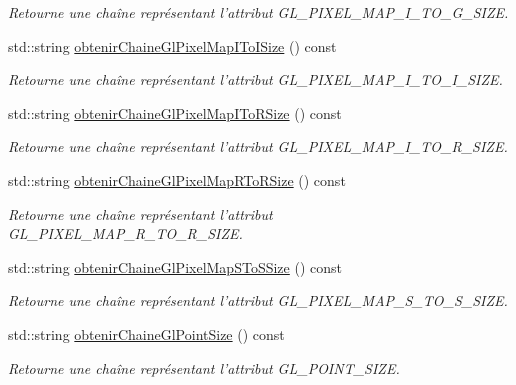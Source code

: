 \begin{DoxyCompactItemize}
\begin{DoxyCompactList}\small\item\em Retourne une chaîne représentant l'attribut G\-L\-\_\-\-P\-I\-X\-E\-L\-\_\-\-M\-A\-P\-\_\-\-I\-\_\-\-T\-O\-\_\-\-G\-\_\-\-S\-I\-Z\-E. \end{DoxyCompactList}\item 
std\-::string \hyperlink{group__utilitaire_ga0eb7b39aef0ca240d98e9507703cd1e4}{obtenir\-Chaine\-Gl\-Pixel\-Map\-I\-To\-I\-Size} () const 
\begin{DoxyCompactList}\small\item\em Retourne une chaîne représentant l'attribut G\-L\-\_\-\-P\-I\-X\-E\-L\-\_\-\-M\-A\-P\-\_\-\-I\-\_\-\-T\-O\-\_\-\-I\-\_\-\-S\-I\-Z\-E. \end{DoxyCompactList}\item 
std\-::string \hyperlink{group__utilitaire_gad3cc6e9acee4df62ca1407e6b42d87d4}{obtenir\-Chaine\-Gl\-Pixel\-Map\-I\-To\-R\-Size} () const 
\begin{DoxyCompactList}\small\item\em Retourne une chaîne représentant l'attribut G\-L\-\_\-\-P\-I\-X\-E\-L\-\_\-\-M\-A\-P\-\_\-\-I\-\_\-\-T\-O\-\_\-\-R\-\_\-\-S\-I\-Z\-E. \end{DoxyCompactList}\item 
std\-::string \hyperlink{group__utilitaire_ga315fd9fa34e26c259ce76e33ddadc11b}{obtenir\-Chaine\-Gl\-Pixel\-Map\-R\-To\-R\-Size} () const 
\begin{DoxyCompactList}\small\item\em Retourne une chaîne représentant l'attribut G\-L\-\_\-\-P\-I\-X\-E\-L\-\_\-\-M\-A\-P\-\_\-\-R\-\_\-\-T\-O\-\_\-\-R\-\_\-\-S\-I\-Z\-E. \end{DoxyCompactList}\item 
std\-::string \hyperlink{group__utilitaire_ga5d77ae2d820ab8304af841033ee957ef}{obtenir\-Chaine\-Gl\-Pixel\-Map\-S\-To\-S\-Size} () const 
\begin{DoxyCompactList}\small\item\em Retourne une chaîne représentant l'attribut G\-L\-\_\-\-P\-I\-X\-E\-L\-\_\-\-M\-A\-P\-\_\-\-S\-\_\-\-T\-O\-\_\-\-S\-\_\-\-S\-I\-Z\-E. \end{DoxyCompactList}\item 
std\-::string \hyperlink{group__utilitaire_gad02efc6cfc989e454b9cc91443fef303}{obtenir\-Chaine\-Gl\-Point\-Size} () const 
\begin{DoxyCompactList}\small\item\em Retourne une chaîne représentant l'attribut G\-L\-\_\-\-P\-O\-I\-N\-T\-\_\-\-S\-I\-Z\-E. \end{DoxyCompactList}\item 

\end{DoxyCompactItemize}
